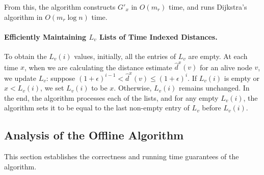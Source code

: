 \documentclass[11pt]{article}
\begin{document}
From this, the algorithm constructs $G'_x$ in $O(m_r)$ time, and runs Dijkstra's algorithm in $O(m_r\log n)$ time. 

\paragraph{Efficiently Maintaining $L_v$ Lists of Time Indexed Distances.}
To obtain the $L_v(i)$ values, initially, all the entries of $L_v$ are empty. 
At each time $x$, when we are calculating the distance estimate $\hat{d}^x(v)$ for an alive node $v$, we update $L_v$: suppose $(1+\epsilon)^{i-1} < \hat{d}^x(v) \leq (1+\epsilon)^{i}$.
If $L_v(i)$ is empty or $x<L_v(i)$, we set $L_v(i)$ to be $x$. Otherwise, $L_v(i)$ remains unchanged. In the end, the algorithm processes each of the lists, and for any empty $L_v(i)$, the algorithm sets it to be equal to the last non-empty entry of $L_v$ before $L_v(i)$.

\subsection{Analysis of the Offline Algorithm}
\label{sec:offline_analysis}

This section establishes the correctness and running time guarantees of the algorithm.   
\end{document}
